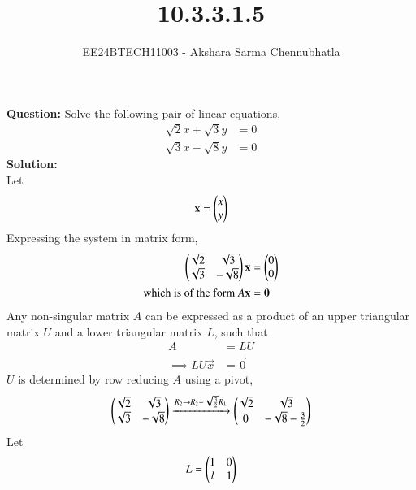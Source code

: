 \documentclass[journal]{IEEEtran}
\begin{document}

\vspace{3cm}

\title{10.3.3.1.5}
\author{EE24BTECH11003 - Akshara Sarma Chennubhatla}
{\let\newpage\relax\maketitle}

\renewcommand{\thefigure}{\theenumi}
\renewcommand{\thetable}{\theenumi}
\setlength{\intextsep}{10pt} %

\textbf{Question:}
\newline
Solve the following pair of linear equations,
\begin{align}
	\sqrt{2}x + \sqrt{3}y &= 0\\
	\sqrt{3}x - \sqrt{8}y &= 0
\end{align}
\textbf{Solution:\\}
Let
\begin{align}
	\mathbf{x} = \begin{pmatrix}x\\y\end{pmatrix}
\end{align}
Expressing the system in matrix form,
\begin{align}
	\begin{pmatrix}\sqrt{2} & \sqrt{3} \\ \sqrt{3} & -\sqrt{8}\end{pmatrix}\mathbf{x} &= \begin{pmatrix}0 \\ 0\end{pmatrix}\\
	\text{which is of the form } A\mathbf{x} &= \mathbf{0}
\end{align}
Any non-singular matrix $A$ can be expressed as a product of an upper triangular matrix $U$ and a lower triangular matrix $L$, such that
\begin{align}
	A &= LU\\
	\implies LU\vec{x} &= \vec{0}
\end{align}
$U$ is determined by row reducing $A$ using a pivot,
\begin{align}
	\begin{pmatrix}\sqrt{2} & \sqrt{3}\\\sqrt{3} & -\sqrt{8}\end{pmatrix} \xrightarrow {R_2 \to R_2 - \sqrt{\frac{3}{2}}R_1} \begin{pmatrix}\sqrt{2} & \sqrt{3}\\0 & -\sqrt{8} - \frac{3}{2}\end{pmatrix}
\end{align}
Let 
\begin{align}
	L = \begin{pmatrix}1 & 0\\l & 1\end{pmatrix}
\end{align}
\end{document}
